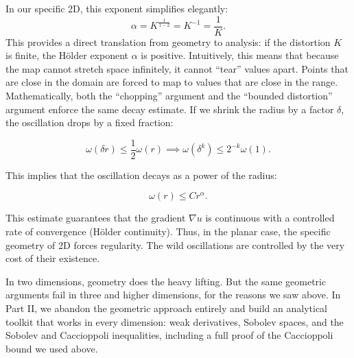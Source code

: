 \documentclass[11pt]{article}
\begin{document}
In our specific 2D, this exponent simplifies elegantly:
\[\alpha = K^{\frac{1}{1-2}} = K^{-1} = \frac{1}{K}.\] This provides a
direct translation from geometry to analysis: if the distortion \(K\) is
finite, the Hölder exponent \(\alpha\) is positive. Intuitively, this
means that because the map cannot stretch space infinitely, it cannot
``tear'' values apart. Points that are close in the domain are forced to
map to values that are close in the range. Mathematically, both the
``chopping'' argument and the ``bounded distortion'' argument enforce
the same decay estimate. If we shrink the radius by a factor \(\delta\),
the oscillation drops by a fixed fraction: \hypertarget{eq-recurrence}{}\label{eq-recurrence}

\[
\omega(\delta r) \le \frac{1}{2} \omega(r) \implies \omega(\delta^k) \le 2^{-k} \omega(1).
\]

This implies that the oscillation decays as a power of the radius:
\hypertarget{eq-holder}{}\label{eq-holder}

\[
\omega(r) \le C r^\alpha.
\]

This estimate guarantees that the gradient \(\nabla u\) is continuous
with a controlled rate of convergence (Hölder continuity). Thus, in the
planar case, the specific geometry of 2D forces regularity. The wild
oscillations are controlled by the very cost of their existence.

In two dimensions, geometry does the heavy lifting. But the same
geometric arguments fail in three and higher dimensions, for the reasons
we saw above. In Part II, we abandon the geometric approach entirely and
build an analytical toolkit that works in every dimension: weak
derivatives, Sobolev spaces, and the Sobolev and Caccioppoli
inequalities, including a full proof of the Caccioppoli bound we used
above.
\end{document}
